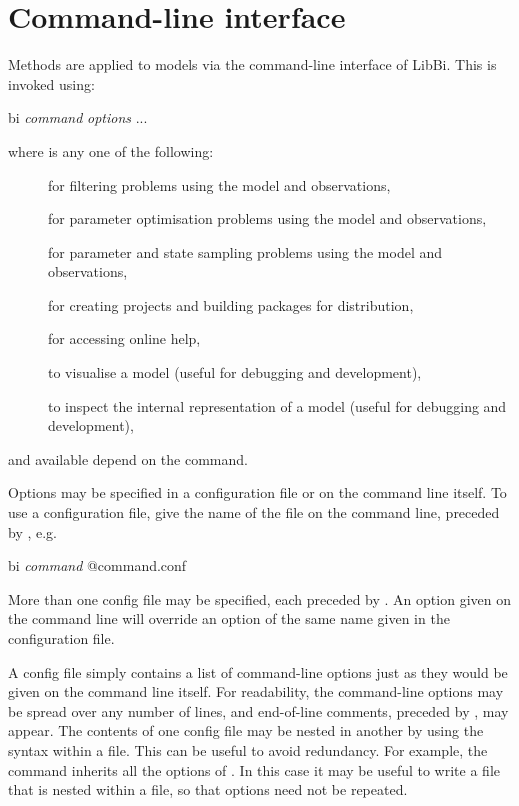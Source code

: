 \section{Command-line interface\label{Command_line_interface}}

Methods are applied to models via the command-line interface of LibBi. This is
invoked using:
\begin{cmdcode}
bi \textit{command} \textit{options} ...
\end{cmdcode}
where  is any one of the following:
\begin{description}
\item[] for filtering problems using the model and
  observations,
\item[] for parameter optimisation problems using the
  model and observations,
\item[] for parameter and state sampling problems using the
  model and observations,
\item[] for creating projects and building packages for
  distribution,
\item[] for accessing online help,
\item[] to visualise a model (useful for
  debugging and development),
\item[] to inspect the internal representation of a model
  (useful for debugging and development),
\end{description}
and available  depend on the command.

Options may be specified in a configuration file or on the
command line itself. To use a configuration file, give the name of the file on
the command line, preceded by , e.g.
\begin{cmdcode}
bi \textit{command} @command.conf
\end{cmdcode}

More than one config file may be specified, each preceded by . An
option given on the command line will override an option of the same name
given in the configuration file.

A config file simply contains a list of command-line options just as they
would be given on the command line itself. For readability, the command-line
options may be spread over any number of lines, and end-of-line comments,
preceded by \bitt{\#}, may appear. The contents of one config file may be
nested in another by using the  syntax within a file. This
can be useful to avoid redundancy. For example, the  command
inherits all the options of . In this case it may be useful
to write a  file that is nested within a 
file, so that options need not be repeated.

